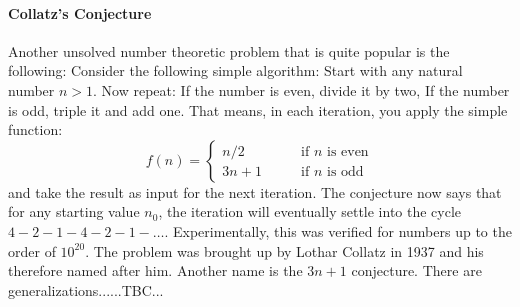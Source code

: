\paragraph{Collatz's Conjecture}
Another unsolved number theoretic problem that is quite popular is the following: Consider the following simple algorithm: Start with any natural number $n > 1$. Now repeat: If the number is even, divide it by two, If the number is odd, triple it and add one. That means, in each iteration, you apply the simple function:
\begin{equation}
f(n) = \begin{cases}
n/2    \qquad & \text{if $n$ is even}  \\
3n + 1 \qquad & \text{if $n$ is odd}
\end{cases}
\end{equation}
and take the result as input for the next iteration. The conjecture now says that for any starting value $n_0$, the iteration will eventually settle into the cycle $4-2-1-4-2-1-\ldots$. Experimentally, this was verified for numbers up to the order of $10^{20}$. The problem was brought up by Lothar Collatz in 1937 and his therefore named after him. Another name is the $3n + 1$ conjecture. There are generalizations......TBC...




\begin{comment}
-Modular addition and multiplication
-Modular exponentiation, logarithms and roots
-Chinese Remainder Theorem
\end{comment}